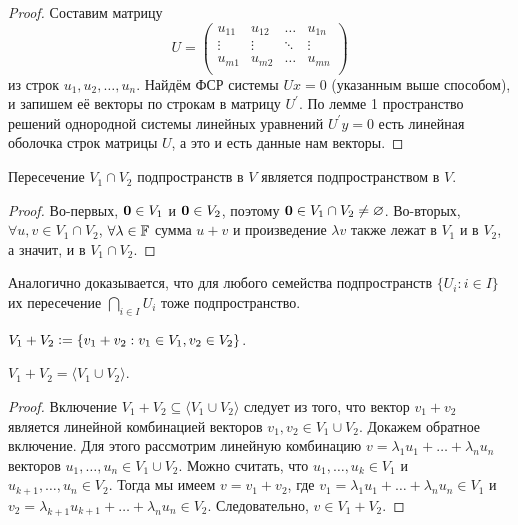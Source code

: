 \begin{proof}
    Составим матрицу
    \[
        U = 
        \begin{pmatrix}
            u_{11} & u_{12} & \ldots & u_{1n}\\
            \vdots & \vdots & \ddots & \vdots\\
            u_{m1} & u_{m2} & \ldots & u_{mn}\\
        \end{pmatrix}
    \]
    из строк $u_1, u_2, \ldots, u_n$. Найдём ФСР системы $Ux = 0$ (указанным выше способом), и запишем её векторы по строкам в матрицу $U^\prime$. По лемме 1 пространство решений однородной системы линейных уравнений $U^\prime y = 0$ есть линейная оболочка строк матрицы $U$, а это и есть данные нам векторы.
\end{proof}

\begin{proposal}
    Пересечение $V_1 \cap V_2$ подпространств в $V$ является подпространством в $V$.
\end{proposal}

\begin{proof}
    Во-первых, $\boldsymbol{0} \in V_1$ и $\boldsymbol{0} \in V_2$, поэтому $\boldsymbol{0} \in V_1 \cap V_2 \ne \varnothing$. Во-вторых, $\forall u, v \in V_1 \cap V_2$, $\forall \lambda \in \mathbb{F}$ сумма $u + v$ и произведение $\lambda v$ также лежат в $V_1$ и в $V_2$, а значит, и в $V_1 \cap V_2$.
\end{proof}

\begin{remark}
    Аналогично доказывается, что для любого семейства подпространств $\{U_i : i \in I\}$ их пересечение $\bigcap\limits_{i \in I}U_i$ тоже подпространство.
\end{remark}

\begin{definition}
    $V_1 + V_2 \vcentcolon = \{v_1 + v_2 : v_1 \in V_1, v_2 \in V_2\}$.
\end{definition}

\begin{proposal}
    $V_1 + V_2 = \langle V_1 \cup V_2\rangle$.
\end{proposal}

\begin{proof}
    Включение $V_1 + V_2 \subseteq \langle V_1 \cup V_2\rangle$ следует из того, что вектор $v_1 + v_2$ является линейной комбинацией векторов $v_1, v_2 \in V_1 \cup V_2$. Докажем обратное включение. Для этого рассмотрим линейную комбинацию $v = \lambda_1u_1 + \ldots + \lambda_nu_n$ векторов $u_1, \ldots, u_n \in V_1 \cup V_2$. Можно считать, что $u_1, \ldots, u_k \in V_1$ и $u_{k + 1}, \ldots, u_n \in V_2$. Тогда мы имеем $v = v_1 + v_2$, где $v_1 = \lambda_1u_1 + \ldots + \lambda_nu_n \in V_1$ и $v_2 = \lambda_{k + 1}u_{k + 1} + \ldots + \lambda_nu_n \in V_2$. Следовательно, $v \in V_1 + V_2$.
\end{proof}

